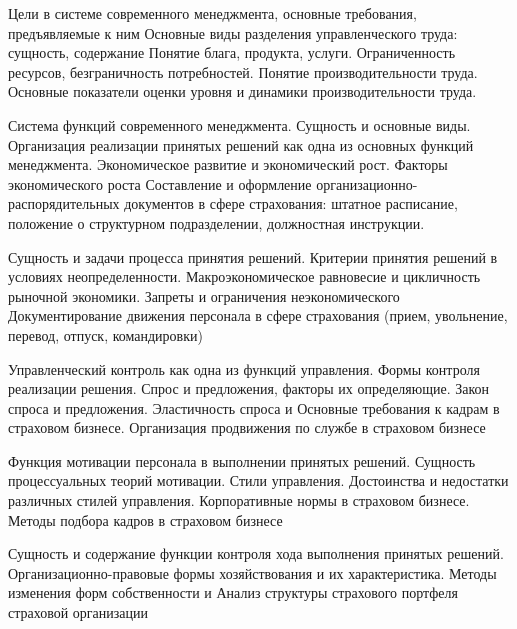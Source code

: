 \documentclass[
	11pt,
	a4paper,
	]
	{article}
\begin{document}
\bigskip

\noindent{} 
	{
		Цели в системе современного менеджмента, основные требования, предъявляемые к ним Основные виды разделения управленческого труда: сущность, содержание
	}{
		Понятие блага, продукта, услуги. Ограниченность ресурсов, безграничность потребностей.
	}{
		Понятие производительности труда. Основные показатели оценки уровня и динамики производительности труда.
	}

\bigskip

\noindent{} 
	{
		Система функций современного менеджмента. Сущность и основные виды. Организация реализации принятых решений как одна из основных функций менеджмента.
	}{
		Экономическое развитие и экономический рост. Факторы экономического роста
	}{
		Составление и оформление организационно-распорядительных документов в сфере страхования: штатное расписание, положение о структурном подразделении, должностная инструкции.
	}

\bigskip

\noindent{} 
	{
		Сущность и задачи процесса принятия решений. Критерии принятия решений в условиях неопределенности.
	}{
		Макроэкономическое равновесие и цикличность рыночной экономики. Запреты и ограничения неэкономического
	}{
		Документирование движения персонала в сфере страхования (прием, увольнение, перевод, отпуск, командировки)
	}

\bigskip

\noindent{} 
	{
		Управленческий контроль как одна из функций управления. Формы контроля реализации решения.
	}{
		Спрос и предложения, факторы их определяющие. Закон спроса и предложения. Эластичность спроса и
	}{
		Основные требования к кадрам в страховом бизнесе. Организация продвижения по службе в страховом бизнесе
	}

\bigskip

\noindent{} 
	{
		Функция мотивации персонала в выполнении принятых решений. Сущность процессуальных теорий мотивации.
	}{
		Стили управления. Достоинства и недостатки различных стилей управления.
	}{
		Корпоративные нормы в страховом бизнесе. Методы подбора кадров в страховом бизнесе
	}

\bigskip

\noindent{} 
	{
		Сущность и содержание функции контроля хода выполнения принятых решений.
	}{
		Организационно-правовые формы хозяйствования и их характеристика. Методы изменения форм собственности и
	}{
		Анализ структуры страхового портфеля страховой организации
	}
\end{document}
